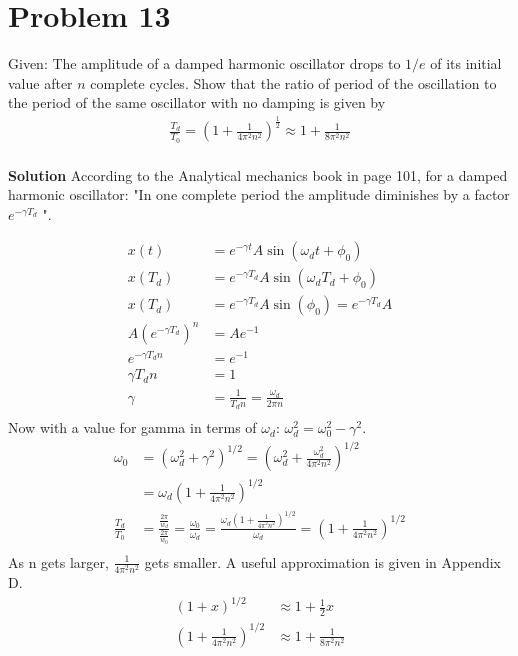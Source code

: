 \documentclass[]{article}
\newcommand{\bd}{\textbf}
\begin{document}
	\section{Problem 13}
	
	Given: The amplitude of a damped harmonic oscillator drops to $ 1 / e $ of its initial value after $ n $ complete cycles. Show that the ratio of period of the oscillation to the period of the same oscillator with no damping is given by
	\begin{equation}
		\begin{split}
			\frac{T_d}{T_0} = \left( 1 + \frac{1}{4 \pi^2 n^2} \right)^\frac{1}{2} \approx 1 + \frac{1}{8 \pi^2 n^2} \\
		\end{split}
	\end{equation}

	\bd{Solution} According to the Analytical mechanics book in page 101, for a damped harmonic oscillator: "In one complete period the amplitude diminishes by a factor $ e^{-\gamma T_d} $ ".
	
	\begin{equation}
		\begin{split}
			x(t) &= e^{-\gamma t} A \sin(\omega_d t +\phi_0) \\
			x(T_d) &= e^{-\gamma T_d} A \sin(\omega_d T_d +\phi_0) \\
			x(T_d) &= e^{-\gamma T_d} A \sin(\phi_0) = e^{-\gamma T_d} A \\
			A\left(  e^{-\gamma T_d} \right)^n &= Ae^{-1} \\
			e^{-\gamma T_d n}  &= e^{-1} \\
			\gamma T_d n &= 1 \\
			\gamma &= \frac{1}{T_d n} = \frac{\omega_d}{2\pi n} \\
		\end{split}
	\end{equation}
	Now with a value for gamma in terms of $ \omega_d $: $ \omega_d^2 = \omega_0^2 - \gamma^2 $.
	\begin{equation}
		\begin{split}
			\omega_0 &= \left( \omega_d^2 + \gamma^2 \right)^{1/2} = \left( \omega_d^2 + \frac{\omega_d^2}{4\pi^2 n^2} \right)^{1/2} \\
			&= \omega_d \left( 1 + \frac{1}{4\pi^2 n^2} \right)^{1/2} \\
			\frac{T_d}{T_0} &= \frac{\frac{2\pi}{w_d}}{\frac{2\pi}{w_0}} = \frac{\omega_0}{\omega_d} = \frac{\omega_d \left( 1 + \frac{1}{4\pi^2 n^2} \right)^{1/2}}{\omega_d} = \left( 1 + \frac{1}{4\pi^2 n^2} \right)^{1/2} \\
		\end{split}
	\end{equation}
	As n gets larger, $ \frac{1}{4\pi^2 n^2} $ gets smaller. A useful approximation is given in Appendix D.
	\begin{equation}
		\begin{split}
			(1 + x)^{1/2} &\approx 1 + \frac{1}{2} x \\
			\left( 1 + \frac{1}{4\pi^2 n^2} \right)^{1/2} &\approx 1 + \frac{1}{8\pi^2 n^2} \\
		\end{split}
	\end{equation}
	
\end{document}
